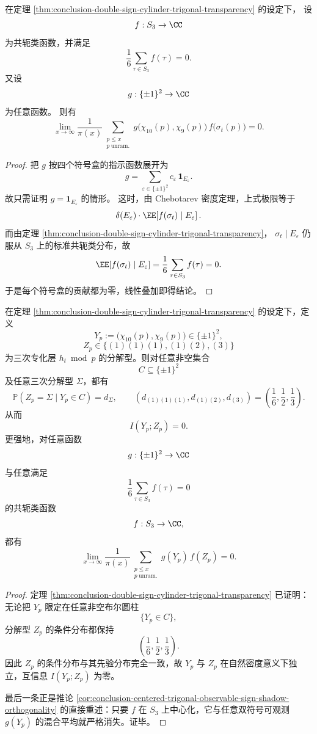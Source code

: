 \begin{corollary}[中心化三次分裂观测与双符号可观测的严格正交]\label{cor:conclusion-centered-trigonal-observable-sign-shadow-orthogonality}
在定理 \ref{thm:conclusion-double-sign-cylinder-trigonal-transparency} 的设定下，
设
\[
f:S_3\to \CC
\]
为共轭类函数，并满足
\[
\frac{1}{6}\sum_{\tau\in S_3}f(\tau)=0.
\]
又设
\[
g:\{\pm 1\}^2\to \CC
\]
为任意函数。
则有
\[
\lim_{x\to\infty}\frac{1}{\pi(x)}
\sum_{\substack{p\le x\\ p\ \mathrm{unram.}}}
g\!\bigl(\chi_{10}(p),\chi_9(p)\bigr)\,
f\!\bigl(\sigma_t(p)\bigr)
=0.
\]
\end{corollary}
\begin{proof}
把 \(g\) 按四个符号盒的指示函数展开为
\[
g=\sum_{\varepsilon\in\{\pm1\}^2}c_\varepsilon\,\mathbf 1_{E_\varepsilon}.
\]
故只需证明 \(g=\mathbf 1_{E_\varepsilon}\) 的情形。
这时，由 Chebotarev 密度定理，上式极限等于
\[
\delta(E_\varepsilon)\cdot
\EE\!\left[f(\sigma_t)\mid E_\varepsilon\right].
\]
而由定理 \ref{thm:conclusion-double-sign-cylinder-trigonal-transparency}，
\(
\sigma_t\mid E_\varepsilon
\)
仍服从 \(S_3\) 上的标准共轭类分布，故
\[
\EE\!\left[f(\sigma_t)\mid E_\varepsilon\right]
=
\frac16\sum_{\tau\in S_3}f(\tau)
=0.
\]
于是每个符号盒的贡献都为零，线性叠加即得结论。
\end{proof}

\begin{theorem}[双符号观测与三次专化层的零互信息定理]\label{thm:conclusion-double-sign-trigonal-zero-mutual-information}
在定理 \ref{thm:conclusion-double-sign-cylinder-trigonal-transparency} 的设定下，定义
\[
Y_p:=\bigl(\chi_{10}(p),\chi_9(p)\bigr)\in\{\pm 1\}^2,
\]
\[
Z_p\in\{(1)(1)(1),(1)(2),(3)\}
\]
为三次专化层 \(h_t\bmod p\) 的分解型。则对任意非空集合
\[
C\subseteq \{\pm 1\}^2
\]
及任意三次分解型 \(\Sigma\)，都有
\[
\mathbb P(Z_p=\Sigma\mid Y_p\in C)=d_\Sigma,
\qquad
(d_{(1)(1)(1)},d_{(1)(2)},d_{(3)})=
\left(\frac16,\frac12,\frac13\right).
\]
从而
\[
I(Y_p;Z_p)=0.
\]
更强地，对任意函数
\[
g:\{\pm 1\}^2\to \CC
\]
与任意满足
\[
\frac16\sum_{\tau\in S_3}f(\tau)=0
\]
的共轭类函数
\[
f:S_3\to \CC,
\]
都有
\[
\lim_{x\to\infty}\frac{1}{\pi(x)}
\sum_{\substack{p\le x\\ p\ \mathrm{unram.}}}
g(Y_p)\,f(Z_p)=0.
\]
\end{theorem}
\begin{proof}
定理 \ref{thm:conclusion-double-sign-cylinder-trigonal-transparency} 已证明：无论把 \(Y_p\) 限定在任意非空布尔圆柱
\[
\{Y_p\in C\},
\]
分解型 \(Z_p\) 的条件分布都保持
\[
\left(\frac16,\frac12,\frac13\right).
\]
因此 \(Z_p\) 的条件分布与其先验分布完全一致，故 \(Y_p\) 与 \(Z_p\) 在自然密度意义下独立，互信息 \(I(Y_p;Z_p)\) 为零。

最后一条正是推论 \ref{cor:conclusion-centered-trigonal-observable-sign-shadow-orthogonality} 的直接重述：只要 \(f\) 在 \(S_3\) 上中心化，它与任意双符号可观测 \(g(Y_p)\) 的混合平均就严格消失。证毕。
\end{proof}

